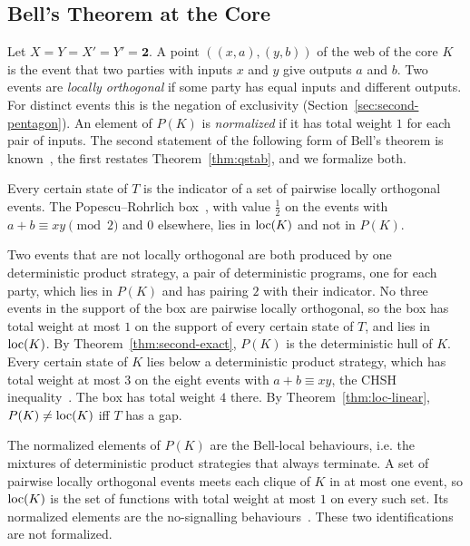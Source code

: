 \subsection{Bell's Theorem at the Core}
\label{sec:duality-bell}

Let $X = Y = X' = Y' = \mathbf{2}$. A point $((x, a), (y, b))$ of the web
of the core $K$ is the event that two parties with inputs $x$ and $y$ give
outputs $a$ and $b$. Two events are \emph{locally orthogonal} if some
party has equal inputs and different outputs. For distinct events this is the negation of exclusivity
(Section~\ref{sec:second-pentagon}). An element of $P(K)$ is \emph{normalized} if it has total
weight $1$ for each pair of inputs. The second statement of the following
form of Bell's theorem is known~\cite{bell1964,chsh1969,popescu-rohrlich1994},
the first restates Theorem~\ref{thm:qstab}, and we formalize both.

\begin{theorem}
\label{thm:bell}
Every certain state of $T$ is the indicator of a set of pairwise locally
orthogonal events. The Popescu--Rohrlich box~\cite{popescu-rohrlich1994},
with value $\tfrac12$ on the
events with $a + b \equiv xy \pmod 2$ and $0$ elsewhere, lies in
$\mathrm{loc}(K)$ and not in $P(K)$.
\end{theorem}

\noindent
Two events that are not locally orthogonal are both produced by one
deterministic product strategy, a pair of deterministic programs, one for
each party, which lies in $P(K)$ and has pairing $2$ with their
indicator. No three events in the support of the box are pairwise
locally orthogonal, so the box has total weight at most $1$ on the support
of every certain state of $T$, and lies in $\mathrm{loc}(K)$. By
Theorem~\ref{thm:second-exact}, $P(K)$ is the deterministic hull of $K$. Every
certain state of $K$ lies below a deterministic product strategy, which
has total weight at most $3$ on the eight events with $a + b \equiv xy$,
the CHSH inequality~\cite{chsh1969}. The box has total weight $4$ there.
By Theorem~\ref{thm:loc-linear}, $P(K) \ne \mathrm{loc}(K)$ iff $T$ has a gap.

The normalized elements of $P(K)$ are the Bell-local behaviours, i.e. the
mixtures of deterministic product strategies that always terminate. A set
of pairwise locally orthogonal events meets each clique of $K$ in at most
one event, so $\mathrm{loc}(K)$ is the set of functions with total weight at most
$1$ on every such set. Its normalized elements are the no-signalling
behaviours~\cite{fritz-lo2013}. These two identifications are not
formalized.
